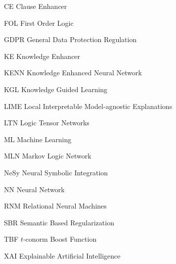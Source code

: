 \begin{abbreviations}
\item[CE] Clause Enhancer
\item[FOL] First Order Logic
\item[GDPR] General Data Protection Regulation
\item[KE] Knowledge Enhancer
\item[KENN] Knowledge Enhanced Neural Network
\item[KGL] Knowledge Guided Learning
\item[LIME] Local Interpretable Model-agnostic Explanations
\item[LTN] Logic Tensor Networks
\item[ML] Machine Learning
\item[MLN] Markov Logic Network
\item[NeSy] Neural Symbolic Integration
\item[NN] Neural Network
\item[RNM] Relational Neural Machines
\item[SBR] Semantic Based Regularization
\item[TBF] $t$-conorm Boost Function
\item[XAI] Explainable Artificial Intelligence

\end{abbreviations}

